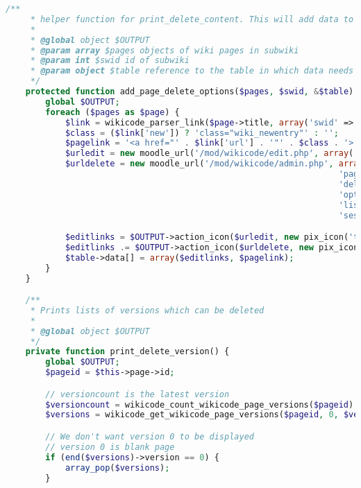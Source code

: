 \begin{lstlisting}[language=PHP]
    /**
     * helper function for print_delete_content. This will add data to the table.
     *
     * @global object $OUTPUT
     * @param array $pages objects of wiki pages in subwiki
     * @param int $swid id of subwiki
     * @param object $table reference to the table in which data needs to be added
     */
    protected function add_page_delete_options($pages, $swid, &$table) {
        global $OUTPUT;
        foreach ($pages as $page) {
            $link = wikicode_parser_link($page->title, array('swid' => $swid));
            $class = ($link['new']) ? 'class="wiki_newentry"' : '';
            $pagelink = '<a href="' . $link['url'] . '"' . $class . '>' . format_string($link['content']) . '</a>';
            $urledit = new moodle_url('/mod/wikicode/edit.php', array('pageid' => $page->id, 'sesskey' => sesskey()));
            $urldelete = new moodle_url('/mod/wikicode/admin.php', array(
                                                                   'pageid'  => $this->page->id,
                                                                   'delete'  => $page->id,
                                                                   'option'  => $this->view,
                                                                   'listall' => !$this->listorphan?'1': '',
                                                                   'sesskey' => sesskey()));

            $editlinks = $OUTPUT->action_icon($urledit, new pix_icon('t/edit', get_string('edit')));
            $editlinks .= $OUTPUT->action_icon($urldelete, new pix_icon('t/delete', get_string('delete')));
            $table->data[] = array($editlinks, $pagelink);
        }
    }

    /**
     * Prints lists of versions which can be deleted
     *
     * @global object $OUTPUT
     */
    private function print_delete_version() {
        global $OUTPUT;
        $pageid = $this->page->id;

        // versioncount is the latest version
        $versioncount = wikicode_count_wikicode_page_versions($pageid) - 1;
        $versions = wikicode_get_wikicode_page_versions($pageid, 0, $versioncount);

        // We don't want version 0 to be displayed
        // version 0 is blank page
        if (end($versions)->version == 0) {
            array_pop($versions);
        }


\end{lstlisting}
